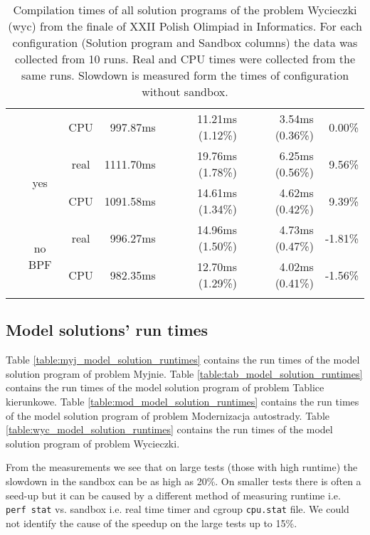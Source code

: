 \documentclass[en]{pracamgr}
\begin{document}
\begin{small}
\begin{longtable}{|l|c|c|r|r|r|r|}
                            &                         & CPU  & 997.87ms & 11.21ms (1.12\%) & 3.54ms (0.36\%) & 0.00\% \\*
                            \cline{2-7}
                            & \multirow{2}{*}{yes}    & real & 1111.70ms & 19.76ms (1.78\%) & 6.25ms (0.56\%) & 9.56\% \\*
                            &                         & CPU  & 1091.58ms & 14.61ms (1.34\%) & 4.62ms (0.42\%) & 9.39\% \\*
                            \cline{2-7}
                            & \multirow{2}{*}{no BPF} & real & 996.27ms & 14.96ms (1.50\%) & 4.73ms (0.47\%) & -1.81\% \\*
                            &                         & CPU  & 982.35ms & 12.70ms (1.29\%) & 4.02ms (0.41\%) & -1.56\% \\
\hline
\caption{Compilation times of all solution programs of the problem Wycieczki (wyc) from the finale of XXII Polish Olimpiad in Informatics. For each configuration (Solution program and Sandbox columns) the data was collected from 10 runs. Real and CPU times were collected from the same runs. Slowdown is measured form the times of configuration without sandbox.}
\label{table:wyc_compilation}
\end{longtable}
\end{small}

\subsection{Model solutions' run times}

Table \ref{table:myj_model_solution_runtimes} contains the run times of the model solution program of problem Myjnie.
Table \ref{table:tab_model_solution_runtimes} contains the run times of the model solution program of problem Tablice kierunkowe.
Table \ref{table:mod_model_solution_runtimes} contains the run times of the model solution program of problem Modernizacja autostrady.
Table \ref{table:wyc_model_solution_runtimes} contains the run times of the model solution program of problem Wycieczki.

From the measurements we see that on large tests (those with high runtime) the slowdown in the sandbox can be as high as 20\%. On smaller tests there is often a seed-up but it can be caused by a different method of measuring runtime i.e. \texttt{perf stat} vs. sandbox i.e. real time timer and cgroup \texttt{cpu.stat} file. We could not identify the cause of the speedup on the large tests up to 15\%.
\end{document}
